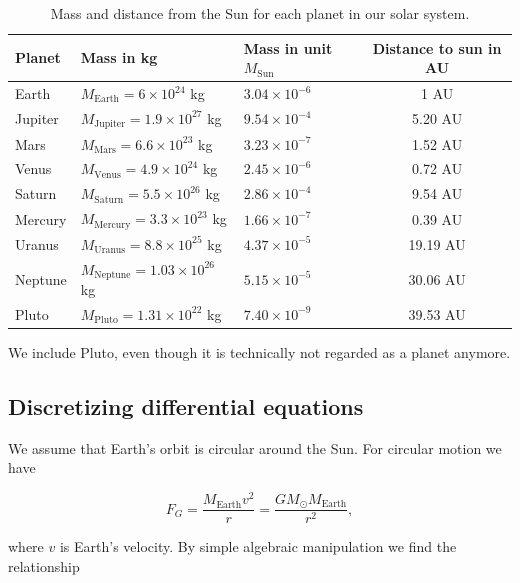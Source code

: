 \documentclass[a4paper, fontsize=11pt]{article}
\begin{document}
\begin{table}[H]
\begin{center}
\caption{Mass and distance from the Sun for each planet in our solar system.}
\begin{tabular}{l l l c}
\toprule
Planet & Mass in kg & Mass in unit $M_{\text{Sun}}$ & Distance to sun in AU \\ \midrule
Earth    &    $M_{\text{Earth}}=6 \times 10^{24} $ kg & $3.04 \times 10^{-6}$ &    1 AU\\
Jupiter    &    $M_{\text{Jupiter}}=1.9 \times 10^{27} $ kg & $9.54 \times 10^{-4}$ &   5.20 AU\\
Mars    &    $M_{\text{Mars}}=6.6 \times 10^{23} $ kg &  $3.23 \times 10^{-7}$  & 1.52 AU\\
Venus    &    $M_{\text{Venus}}=4.9 \times 10^{24} $ kg &  $2.45 \times 10^{-6}$  &  0.72 AU\\
Saturn    &    $M_{\text{Saturn}}=5.5 \times 10^{26} $ kg &  $2.86 \times 10^{-4}$  &  9.54 AU\\
Mercury    &    $M_{\text{Mercury}}=3.3 \times 10^{23} $ kg &  $1.66 \times 10^{-7}$ &   0.39 AU\\
Uranus    &    $M_{\text{Uranus}}=8.8 \times 10^{25} $ kg &  $4.37 \times 10^{-5}$ &   19.19 AU\\
Neptune    &    $M_{\text{Neptune}}=1.03 \times 10^{26} $ kg &  $5.15 \times 10^{-5}$  & 30.06 AU\\
Pluto    &    $M_{\text{Pluto}}=1.31 \times 10^{22} $ kg &  $7.40 \times 10^{-9}$ &   39.53 AU\\
\bottomrule
\end{tabular}
\label{PlanetMass}
\end{center}
\end{table}

We include Pluto, even though it is technically not regarded as a planet anymore. 

\subsection{Discretizing differential equations}
We assume that Earth's orbit is circular around the Sun. For circular motion we have

\begin{equation}
F_{G} = \dfrac{M_{\text{Earth}}v^2}{r}=\dfrac{GM_{\odot} M_{\text{Earth}}}{r^2},
\end{equation}

where $v$ is Earth's velocity. By simple algebraic manipulation we find the relationship
\end{document}
